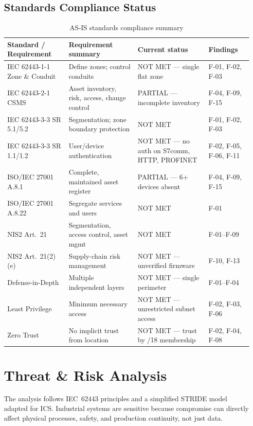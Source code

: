 \documentclass[11pt,a4paper]{article}
\begin{document}
\subsection{Standards Compliance Status}
\begin{longtable}{L{3.6cm} L{4.6cm} L{3.8cm} L{2.6cm}}
\caption{AS-IS standards compliance summary}\\
\toprule
\textbf{Standard / Requirement} & \textbf{Requirement summary} & \textbf{Current status} & \textbf{Findings} \\
\midrule \endhead
IEC 62443-1-1 Zone \& Conduit & Define zones; control conduits & NOT MET --- single flat zone & F-01, F-02, F-03 \\
IEC 62443-2-1 CSMS & Asset inventory, risk, access, change control & PARTIAL --- incomplete inventory & F-04, F-09, F-15 \\
IEC 62443-3-3 SR 5.1/5.2 & Segmentation; zone boundary protection & NOT MET & F-01, F-02, F-03 \\
IEC 62443-3-3 SR 1.1/1.2 & User/device authentication & NOT MET --- no auth on S7comm, HTTP, PROFINET & F-02, F-05, F-06, F-11 \\
ISO/IEC 27001 A.8.1 & Complete, maintained asset register & PARTIAL --- 6+ devices absent & F-04, F-09, F-15 \\
ISO/IEC 27001 A.8.22 & Segregate services and users & NOT MET & F-01 \\
NIS2 Art.~21 & Segmentation, access control, asset mgmt & NOT MET & F-01--F-09 \\
NIS2 Art.~21(2)(e) & Supply-chain risk management & NOT MET --- unverified firmware & F-10, F-13 \\
Defense-in-Depth & Multiple independent layers & NOT MET --- single perimeter & F-01--F-04 \\
Least Privilege & Minimum necessary access & NOT MET --- unrestricted subnet access & F-02, F-03, F-06 \\
Zero Trust & No implicit trust from location & NOT MET --- trust by /18 membership & F-02, F-04, F-08 \\
\bottomrule
\end{longtable}


\section{Threat \& Risk Analysis} 
The analysis follows IEC~62443 principles and a simplified STRIDE model adapted
for ICS. Industrial systems are sensitive because compromise can directly
affect physical processes, safety, and production continuity, not just data.
\end{document}
